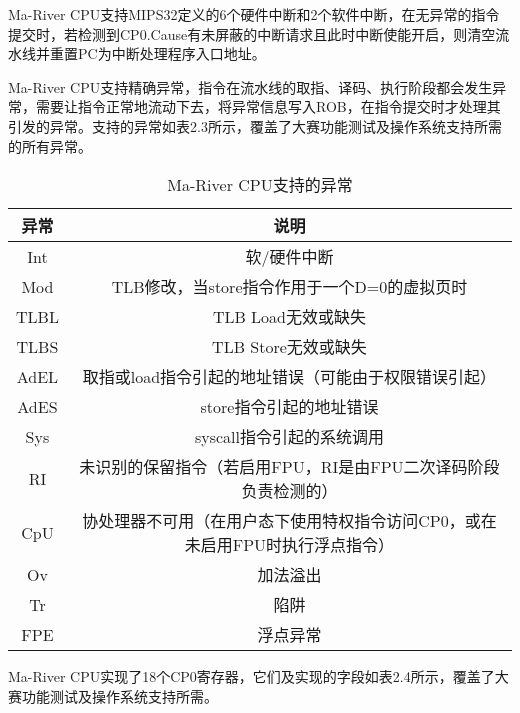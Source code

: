 Ma-River CPU支持MIPS32定义的6个硬件中断和2个软件中断，在无异常的指令提交时，若检测到CP0.Cause有未屏蔽的中断请求且此时中断使能开启，则清空流水线并重置PC为中断处理程序入口地址。

Ma-River CPU支持精确异常，指令在流水线的取指、译码、执行阶段都会发生异常，需要让指令正常地流动下去，将异常信息写入ROB，在指令提交时才处理其引发的异常。支持的异常如表2.3所示，覆盖了大赛功能测试及操作系统支持所需的所有异常。

\begin{table}[htbp]
\centering
\caption{Ma-River CPU支持的异常}
    \label{fig:enter-label}
\begin{tabular}{c|c}
\hline  %
\textbf{异常} & \textbf{说明}\\
\hline
Int & 软/硬件中断\\
Mod & TLB修改，当store指令作用于一个D=0的虚拟页时\\
TLBL & TLB Load无效或缺失\\
TLBS & TLB Store无效或缺失\\
AdEL & 取指或load指令引起的地址错误（可能由于权限错误引起）\\
AdES & store指令引起的地址错误\\
Sys & syscall指令引起的系统调用\\
RI & 未识别的保留指令（若启用FPU，RI是由FPU二次译码阶段负责检测的）\\
CpU & 协处理器不可用（在用户态下使用特权指令访问CP0，或在未启用FPU时执行浮点指令）\\
Ov & 加法溢出\\
Tr & 陷阱\\
FPE & 浮点异常\\
\hline

\end{tabular}

\end{table}

Ma-River CPU实现了18个CP0寄存器，它们及实现的字段如表2.4所示，覆盖了大赛功能测试及操作系统支持所需。

